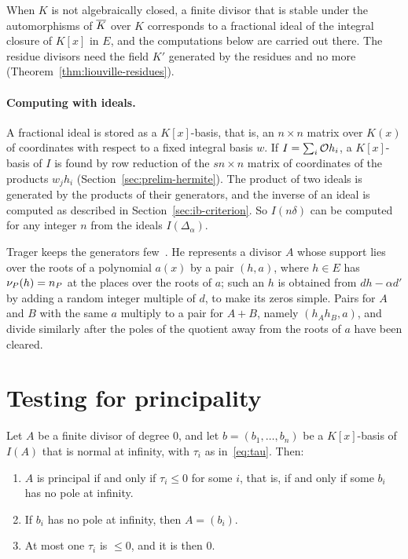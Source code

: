 When $K$ is not algebraically closed, a finite divisor that is stable under
the automorphisms of $\overline{K}$ over $K$ corresponds to a fractional ideal of
the integral closure of $K[x]$ in $E$, and the computations below are
carried out there. The residue divisors need the field $K'$ generated by the
residues and no more (Theorem~\ref{thm:liouville-residues}).

\paragraph{Computing with ideals.} A fractional ideal is stored as a
$K[x]$-basis, that is, an $n \times n$ matrix over $K(x)$ of coordinates with
respect to a fixed integral basis $w$. If $I = \sum_i \mathcal{O} h_i$, a
$K[x]$-basis of $I$ is found by row reduction of the $sn \times n$ matrix of
coordinates of the products $w_j h_i$ (Section~\ref{sec:prelim-hermite}). The
product of two ideals is generated by the products of their generators, and
the inverse of an ideal is computed as described in
Section~\ref{sec:ib-criterion}. So $I(n\delta)$ can be computed for any
integer $n$ from the ideals $I(\Delta_\alpha)$.

Trager keeps the generators few~\cite[\S5.3]{trager1984}. He represents a
divisor $A$ whose support lies over the roots of a polynomial $a(x)$ by a
pair $(h, a)$, where $h \in E$ has $\nu_{P}(h) = n_P$ at the places over the
roots of $a$; such an $h$ is obtained from $dh - \alpha d'$ by adding a
random integer multiple of $d$, to make its zeros simple. Pairs for $A$ and
$B$ with the same $a$ multiply to a pair for $A + B$, namely $(h_A h_B, a)$,
and divide similarly after the poles of the quotient away from the roots of
$a$ have been cleared.

\section{Testing for principality}\label{sec:div-principal}

\begin{theorem}[Trager]\label{thm:principal}
Let $A$ be a finite divisor of degree $0$, and let $b = (b_1, \dots, b_n)$ be
a $K[x]$-basis of $I(A)$ that is normal at infinity, with $\tau_i$ as
in~\eqref{eq:tau}. Then:
\begin{enumerate}[label=\textup{(\roman*)}]
\item $A$ is principal if and only if $\tau_i \le 0$ for some $i$, that is, if
  and only if some $b_i$ has no pole at infinity.
\item If $b_i$ has no pole at infinity, then $A = (b_i)$.
\item At most one $\tau_i$ is $\le 0$, and it is then $0$.
\end{enumerate}
\end{theorem}


